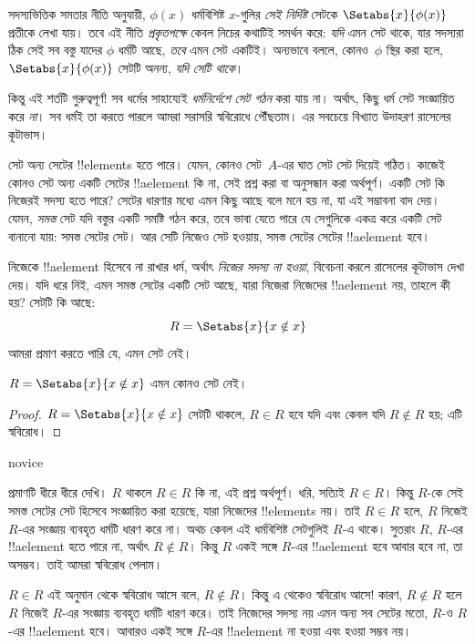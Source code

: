 \documentclass[../../../include/open-logic-section]{subfiles}
\begin{document}

সদস্যভিত্তিক সমতার নীতি অনুযায়ী, $\phi(x)$ ধর্মবিশিষ্ট $x$-গুলির
\emph{সেই নির্দিষ্ট} সেটকে $\Setabs{x}{\phi(x)}$ প্রতীকে লেখা যায়।
তবে এই নীতি \emph{প্রকৃতপক্ষে} কেবল নিচের কথাটিই সমর্থন করে:
\emph{যদি} এমন সেট থাকে, যার সদস্যরা ঠিক সেই সব বস্তু যাদের $\phi$
ধর্মটি আছে, \emph{তবে} এমন সেট একটিই। অন্যভাবে বললে, কোনও~$\phi$
স্থির করা হলে, $\Setabs{x}{\phi(x)}$ সেটটি অনন্য, \emph{যদি সেটি থাকে}।

কিন্তু এই শর্তটি গুরুত্বপূর্ণ!{} সব ধর্মের সাহায্যেই
\emph{ধর্মনির্দেশে সেট গঠন} করা যায় না। অর্থাৎ, কিছু ধর্ম সেট
সংজ্ঞায়িত করে \emph{না}। সব ধর্মই তা করতে পারলে আমরা সরাসরি
স্ববিরোধে পৌঁছতাম। এর সবচেয়ে বিখ্যাত উদাহরণ রাসেলের কূটাভাস।

সেট অন্য সেটের !!{element}s হতে পারে। যেমন, কোনও সেট~$A$-এর ঘাত সেট
সেট দিয়েই গঠিত। কাজেই কোনও সেট অন্য একটি সেটের !!a{element} কি না,
সেই প্রশ্ন করা বা অনুসন্ধান করা অর্থপূর্ণ। একটি সেট কি নিজেরই সদস্য হতে পারে?
সেটের ধারণার মধ্যে এমন কিছু আছে বলে মনে হয় না, যা এই সম্ভাবনা বাদ দেয়।
যেমন, \emph{সমস্ত} সেট যদি বস্তুর একটি সমষ্টি গঠন করে, তবে ভাবা যেতে পারে
যে সেগুলিকে একত্র করে একটি সেট বানানো যায়: সমস্ত সেটের সেট। আর সেটি
নিজেও সেট হওয়ায়, সমস্ত সেটের সেটের !!a{element} হবে।

নিজেকে !!a{element} হিসেবে না রাখার ধর্ম, অর্থাৎ \emph{নিজের সদস্য না হওয়া},
বিবেচনা করলে রাসেলের কূটাভাস দেখা দেয়। যদি ধরে নিই, এমন সমস্ত সেটের
একটি সেট আছে, যারা নিজেরা নিজেদের !!a{element} নয়, তাহলে কী হয়?
সেটটি কি আছে:
\[
R = \Setabs{x}{x \notin x}
\]
আমরা প্রমাণ করতে পারি যে, এমন সেট নেই।

\begin{thm}[রাসেলের কূটাভাস]
	$R = \Setabs{x}{x \notin x}$ এমন কোনও সেট নেই।
\end{thm}

\begin{proof}
$R = \Setabs{x}{x \notin x}$ সেটটি থাকলে,
$R \in R$ হবে যদি এবং কেবল যদি $R \notin R$ হয়; এটি স্ববিরোধ।
\end{proof}

\begin{tagblock}{novice}
\begin{explain}
প্রমাণটি ধীরে ধীরে দেখি। $R$ থাকলে $R \in R$ কি না, এই প্রশ্ন অর্থপূর্ণ।
ধরি, সত্যিই $R \in R$। কিন্তু $R$-কে সেই সমস্ত সেটের সেট হিসেবে সংজ্ঞায়িত
করা হয়েছে, যারা নিজেদের !!{element}s নয়। তাই $R \in R$ হলে,
$R$ নিজেই $R$-এর সংজ্ঞায় ব্যবহৃত ধর্মটি ধারণ করে না। অথচ কেবল এই ধর্মবিশিষ্ট
সেটগুলিই $R$-এ থাকে। সুতরাং $R$, $R$-এর !!a{element} হতে পারে না,
অর্থাৎ $R \notin R$। কিন্তু $R$ একই সঙ্গে $R$-এর !!a{element} হবে
আবার হবে না, তা অসম্ভব। তাই আমরা স্ববিরোধ পেলাম।

$R \in R$ এই অনুমান থেকে স্ববিরোধ আসে বলে, $R \notin R$।
কিন্তু এ থেকেও স্ববিরোধ আসে!{} কারণ, $R \notin R$ হলে $R$ নিজেই
$R$-এর সংজ্ঞায় ব্যবহৃত ধর্মটি ধারণ করে। তাই নিজেদের সদস্য নয় এমন অন্য
সব সেটের মতো, $R$-ও $R$-এর !!a{element} হবে। আবারও একই সঙ্গে
$R$-এর !!a{element} না হওয়া এবং হওয়া সম্ভব নয়।
\end{explain}
\end{tagblock}
\end{document}
